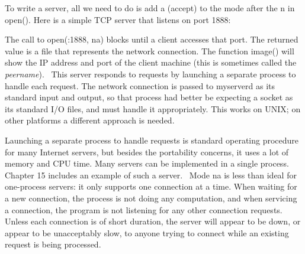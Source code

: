 To write a server, all we need to do is add
\textsf{{\textquotedbl}a{\textquotedbl}} (accept) to the mode after the
\textsf{{\textquotedbl}n{\textquotedbl}} in \textsf{open()}. Here is a
simple TCP server that listens on port 1888:


The call to \textsf{open({\textquotedbl}:1888{\textquotedbl},
{\textquotedbl}na{\textquotedbl})} blocks until a client accesses that
port. The returned value is a file that represents the network
connection. The function \textsf{image()}
will show the IP address and port of the client machine (this is
sometimes called the \textit{peername}). \ This server
responds to requests by launching a separate process to handle each
request. The network connection is passed to \textsf{myserverd} as its
standard input and output, so that process had better be expecting a
socket as its standard I/O files, and must handle it appropriately.
This works on UNIX; on other platforms a different approach is needed.

Launching a separate process to handle requests is standard operating
procedure for many Internet servers, but besides the portability
concerns, it uses a lot of memory and CPU time. Many servers can be
implemented in a single process. Chapter 15 includes an example of such
a server. \ Mode \textsf{{\textquotedbl}na{\textquotedbl}} is less than
ideal for one-process servers: it only supports one connection at a
time. When waiting for a new connection, the process is not doing any
computation, and when servicing a connection, the program is not
listening for any other connection requests. Unless each connection is
of short duration, the server will appear to be down, or appear to be
unacceptably slow, to anyone trying to connect while an existing
request is being processed.

